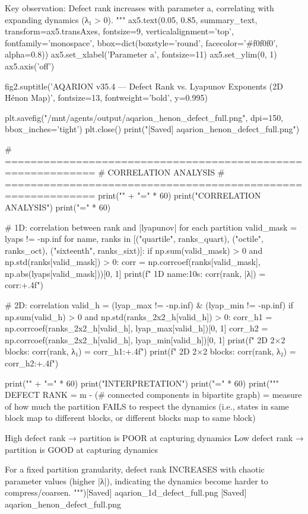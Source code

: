 {{{{{{{{{{{{{Key observation: Defect rank increases with parameter a,
correlating with expanding dynamics (λ₁ > 0).
"""
ax5.text(0.05, 0.85, summary_text, transform=ax5.transAxes,
         fontsize=9, verticalalignment='top', fontfamily='monospace',
         bbox=dict(boxstyle='round', facecolor='#f0f0f0', alpha=0.8))
ax5.set_xlabel('Parameter a', fontsize=11)
ax5.set_ylim(0, 1)
ax5.axis('off')

fig2.suptitle('AQARION v35.4 — Defect Rank vs. Lyapunov Exponents (2D Hénon Map)',
              fontsize=13, fontweight='bold', y=0.995)

plt.savefig("/mnt/agents/output/aqarion_henon_defect_full.png", dpi=150, bbox_inches='tight')
plt.close()
print("[Saved] aqarion_henon_defect_full.png")

# ============================================================
# CORRELATION ANALYSIS
# ============================================================
print("\n" + "=" * 60)
print("CORRELATION ANALYSIS")
print("=" * 60)

# 1D: correlation between rank and |lyapunov| for each partition
valid_mask = lyaps != -np.inf
for name, ranks in [("quartile", ranks_quart), ("octile", ranks_oct), ("sixteenth", ranks_sixt)]:
    if np.sum(valid_mask) > 0 and np.std(ranks[valid_mask]) > 0:
        corr = np.corrcoef(ranks[valid_mask], np.abs(lyaps[valid_mask]))[0, 1]
        print(f"  1D {name:10s}: corr(rank, |λ|) = {corr:+.4f}")

# 2D: correlation
valid_h = (lyap_max != -np.inf) & (lyap_min != -np.inf)
if np.sum(valid_h) > 0 and np.std(ranks_2x2_h[valid_h]) > 0:
    corr_h1 = np.corrcoef(ranks_2x2_h[valid_h], lyap_max[valid_h])[0, 1]
    corr_h2 = np.corrcoef(ranks_2x2_h[valid_h], lyap_min[valid_h])[0, 1]
    print(f"  2D 2×2 blocks: corr(rank, λ₁) = {corr_h1:+.4f}")
    print(f"  2D 2×2 blocks: corr(rank, λ₂) = {corr_h2:+.4f}")

print("\n" + "=" * 60)
print("INTERPRETATION")
print("=" * 60)
print("""
DEFECT RANK = m - (# connected components in bipartite graph)
            = measure of how much the partition FAILS to respect
              the dynamics (i.e., states in same block map to
              different blocks, or different blocks map to same block)

High defect rank → partition is POOR at capturing dynamics
Low defect rank  → partition is GOOD at capturing dynamics

For a fixed partition granularity, defect rank INCREASES with
chaotic parameter values (higher |λ|), indicating the dynamics
become harder to compress/coarsen.
""")[Saved] aqarion_1d_defect_full.png
[Saved] aqarion_henon_defect_full.png

}}}}}}}}}}}}}
